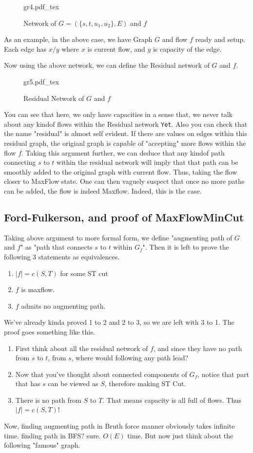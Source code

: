 \documentclass[12pt]{article}
\begin{document}
\begin{figure}[H]
	\centering
	\def\svgwidth{\columnwidth}
	{gr4.pdf_tex}
	\caption{Network of $G = (\{s,t,u_1,u_2\},E)$ and $f$}
	\label{fig:gr4}
\end{figure}

As an example, in the above case, we have Graph $G$ and flow $f$ ready and setup. Each edge has $x/y$ where $x$ is current flow, and $y$ is capacity of the edge.

Now using the above network, we can define the Residual network of $G$ and $f$.
\begin{figure}[H]
	\centering
	\def\svgwidth{\columnwidth}
	{gr5.pdf_tex}
	\caption{Residual Network of $G$ and $f$}
	\label{fig:gr5}
\end{figure}
You can see that here, we only have capacities in a sense that, we never talk about any kindof flows within the Residual network \texttt{Yet}. Also you can check that the name "residual" is almost self evident. If there are values on edges within this residual graph, the origianl graph is capable of "accepting" more flows within the flow $f$. Taking this argument further, we can deduce that any kindof path connecting $s$ to $t$ within the residual network will imply that that path can be smoothly added to the original graph with current flow. Thus, taking the flow closer to MaxFlow state. One can then vaguely suspect that once no more paths can be added, the flow is indeed Maxflow. Indeed, this is the case.
\subsection{Ford-Fulkerson, and proof of MaxFlowMinCut}

Taking above argument to more formal form, we define "augmenting path of $G$ and $f$" as "path that connects $s$ to $t$ within $G_f$". Then it is left to prove the following 3 statements as equivalences.

\begin{enumerate}
  \item $|f|=c(S,T)$ for some ST cut
  \item $f$ is maxflow.
  \item $f$ admits no augmenting path.
\end{enumerate}

We've already kinda proved 1 to 2 and 2 to 3, so we are left with 3 to 1. The proof goes something like this.
\begin{enumerate}
  \item First think about all the residual network of $f$, and since they have no path from $s$ to $t$, from $s$, where would following any path lead?
  \item Now that you've thought about connected components of $G_f$, notice that part that has $s$ can be viewed as $S$, therefore making ST Cut.
  \item There is no path from $S$ to $T$. That means capacity is all full of flows. Thus $|f|=c(S,T)$!
\end{enumerate}
Now, finding augmenting path in Bruth force manner obviously takes infinite time. finding path in BFS? sure. $O(E)$ time.
But now just think about the following "famous" graph.
\end{document}
